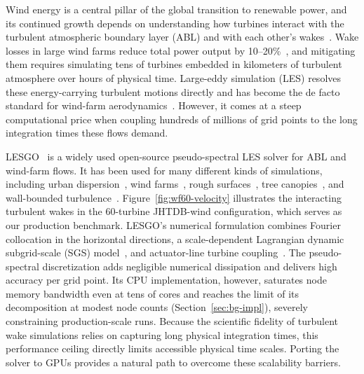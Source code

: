 Wind energy is a central pillar of the global transition to renewable
power, and its continued growth depends on understanding how
turbines interact with the turbulent atmospheric boundary layer (ABL)
and with each other's wakes~\cite{veers2019}. Wake losses in large wind
farms reduce total power output by 10--20\%~\cite{barthelmie2009}, and
mitigating them requires simulating tens of turbines embedded in
kilometers of turbulent atmosphere over hours of physical time.
Large-eddy simulation (LES) resolves these energy-carrying turbulent
motions directly and has become the de facto standard for wind-farm
aerodynamics~\cite{calaf2010, stevens2017}. However, it comes at a steep
computational price when coupling hundreds of millions of grid points to
the long integration times these flows demand.

LESGO~\cite{lesgo-web,bouzeid2005} is a widely used open-source pseudo-spectral
LES solver for ABL and wind-farm flows.  It has been used for many
different kinds of simulations, including urban dispersion~\cite{tseng2006}, wind farms~\cite{calaf2010,stevens2014precursor,
stevens2016spacing,shapiro2019fad,narasimhan2022veer,zhu2025jhtdbwind,xiao2025diurnal}, rough surfaces~\cite{anderson2010,
anderson2011,anderson2012}, tree canopies~\cite{graham2012}, and wall-bounded turbulence~\cite{porteagel2000,bouzeid2005,
yang2015iwm,bretheim2015}. 
Figure~\ref{fig:wf60-velocity} illustrates the interacting turbulent wakes in
the 60-turbine JHTDB-wind configuration, which serves as our production
benchmark. LESGO's numerical formulation combines Fourier
collocation in the horizontal directions, a scale-dependent Lagrangian dynamic
subgrid-scale (SGS) model~\cite{bouzeid2005}, and actuator-line turbine
coupling~\cite{sorensen2002}. The pseudo-spectral discretization adds negligible
numerical dissipation and delivers high accuracy per grid point. Its CPU implementation,
however, saturates node memory bandwidth even at tens of cores and reaches the limit of its decomposition at modest node counts (Section~\ref{sec:bg-impl}), severely
constraining production-scale runs.  Because the scientific fidelity of
turbulent wake simulations relies on capturing long physical integration times,
this performance ceiling directly limits accessible physical time scales.
Porting the solver to GPUs provides a natural path to overcome these
scalability barriers.


